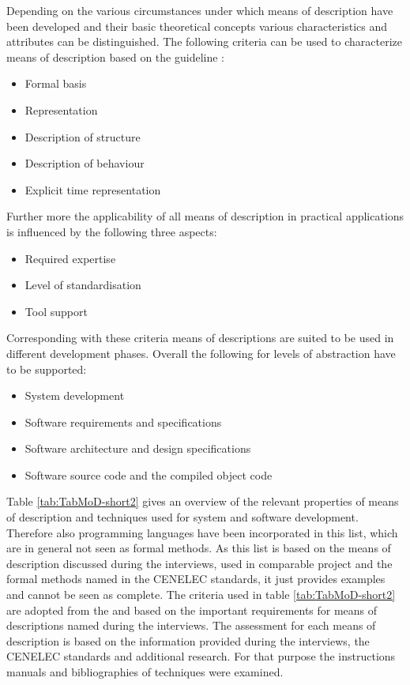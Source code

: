 \documentclass{./template/openetcs2}
\begin{document}
Depending  on the various circumstances under which means of description have been developed and their basic theoretical concepts various characteristics and attributes can be distinguished.  The following  criteria can be used to characterize  means of description based on the guideline \citeauthor{VDIVDE3681}:
\vspace{-10pt}
\begin{itemize}[topsep=2pt, partopsep=2pt,itemsep=2pt,parsep=2pt]
  \item Formal basis
  \item Representation
  \item Description of structure
  \item Description of behaviour
  \item Explicit time representation
\end{itemize}
Further more the applicability of all means of description in practical applications is influenced by the following three aspects:

\vspace{-10pt}
\begin{itemize}[topsep=2pt, partopsep=2pt,itemsep=2pt,parsep=2pt]
  \item Required expertise
  \item Level of standardisation
  \item Tool support
\end{itemize}

Corresponding with these criteria means of descriptions are suited to be used in different development phases. Overall the following for levels of abstraction have to be supported:

\vspace{-10pt}
\begin{itemize}[topsep=2pt, partopsep=2pt,itemsep=2pt,parsep=2pt]
  \item System development
  \item Software requirements and specifications
  \item Software architecture and design specifications
  \item Software source code and the compiled object code
\end{itemize}

Table \ref{tab:TabMoD-short2} gives an overview of the relevant properties of means of description and techniques used for system  and software development. Therefore also programming languages have been incorporated in this list, which are in general not seen as formal methods. As this list is based on the means of description discussed during the interviews, used in comparable project and the formal methods named in the CENELEC standards, it just provides examples and cannot be seen as complete. The criteria used in table \ref{tab:TabMoD-short2} are adopted from the \citeauthor{VDIVDE3681} and based on the important requirements for means of descriptions named during the interviews. The assessment for each means of description is based on the information provided during the interviews, the CENELEC standards and additional research. For that purpose the instructions manuals and  bibliographies of techniques were examined.
\end{document}

